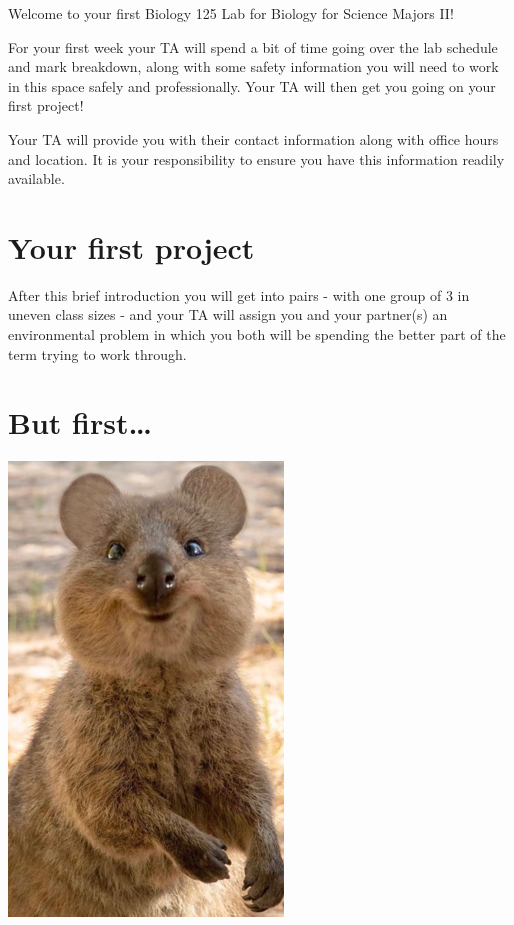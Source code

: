 \documentclass[
]{book}
\begin{document}
Welcome to your first Biology 125 Lab for Biology for Science Majors II!

For your first week your TA will spend a bit of time going over the lab schedule and mark breakdown, along with some safety information you will need to work in this space safely and professionally. Your TA will then get you going on your first project!

Your TA will provide you with their contact information along with office hours and location. It is your responsibility to ensure you have this information readily available.

\hypertarget{your-first-project}{%
\section*{Your first project}\label{your-first-project}}

After this brief introduction you will get into pairs - with one group of 3 in uneven class sizes - and your TA will assign you and your partner(s) an environmental problem in which you both will be spending the better part of the term trying to work through.

\hypertarget{but-first}{%
\section*{But first\ldots{}}\label{but-first}}

\includegraphics{images/img-1.png}
\end{document}
